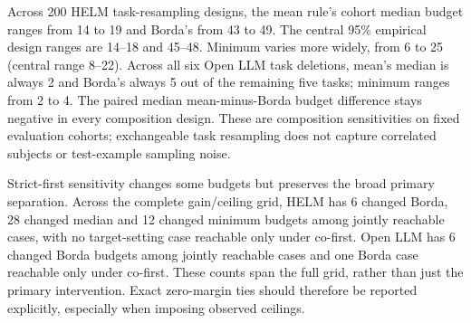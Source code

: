 Across 200 HELM task-resampling designs, the mean rule's cohort median budget ranges from 14 to 19 and Borda's from 43 to 49. The central 95\% empirical design ranges are 14--18 and 45--48. Minimum varies more widely, from 6 to 25 (central range 8--22). Across all six Open LLM task deletions, mean's median is always 2 and Borda's always 5 out of the remaining five tasks; minimum ranges from 2 to 4. The paired median mean-minus-Borda budget difference stays negative in every composition design. These are composition sensitivities on fixed evaluation cohorts; exchangeable task resampling does not capture correlated subjects or test-example sampling noise.

Strict-first sensitivity changes some budgets but preserves the broad primary separation. Across the complete gain/ceiling grid, HELM has 6 changed Borda, 28 changed median and 12 changed minimum budgets among jointly reachable cases, with no target-setting case reachable only under co-first. Open LLM has 6 changed Borda budgets among jointly reachable cases and one Borda case reachable only under co-first. These counts span the full grid, rather than just the primary intervention. Exact zero-margin ties should therefore be reported explicitly, especially when imposing observed ceilings.
